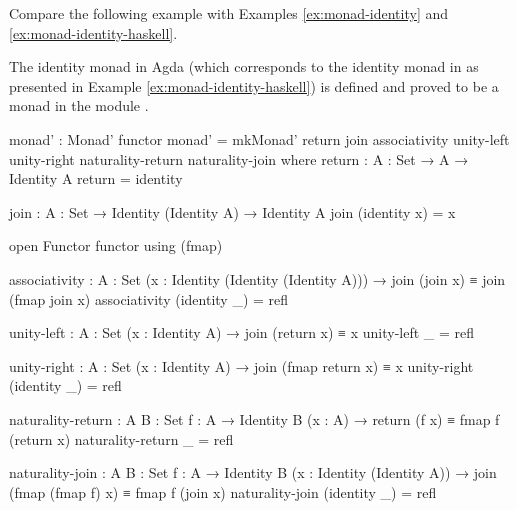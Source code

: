  Compare the following example
with Examples \ref{ex:monad-identity} and
\ref{ex:monad-identity-haskell}.

\begin{example}
  \label{ex:monad-identity-agda}

  The identity monad in Agda (which corresponds to the identity monad
  in \hask as presented in Example \ref{ex:monad-identity-haskell}) is
  defined and proved to be a monad in the module
  .
  \begin{codeagda}
monad' : Monad' functor
monad' = mkMonad' return join associativity unity-left unity-right
                  naturality-return naturality-join
  where
    return : {A : Set} → A → Identity A
    return = identity

    join : {A : Set} → Identity (Identity A) → Identity A
    join (identity x) = x

    open Functor functor using (fmap)

    associativity : {A : Set} (x : Identity (Identity (Identity A))) →
                    join (join x) ≡ join (fmap join x)
    associativity (identity _) = refl

    unity-left : {A : Set} (x : Identity A) → join (return x) ≡ x
    unity-left _ = refl

    unity-right : {A : Set} (x : Identity A) → join (fmap return x) ≡ x
    unity-right (identity _) = refl

    naturality-return : {A B : Set} {f : A → Identity B} (x : A) →
                        return (f x) ≡ fmap f (return x)
    naturality-return _ = refl

    naturality-join : {A B : Set} {f : A → Identity B}
                      (x : Identity (Identity A)) →
                      join (fmap (fmap f) x) ≡ fmap f (join x)
    naturality-join (identity _) = refl
  \end{codeagda}

\end{example}

